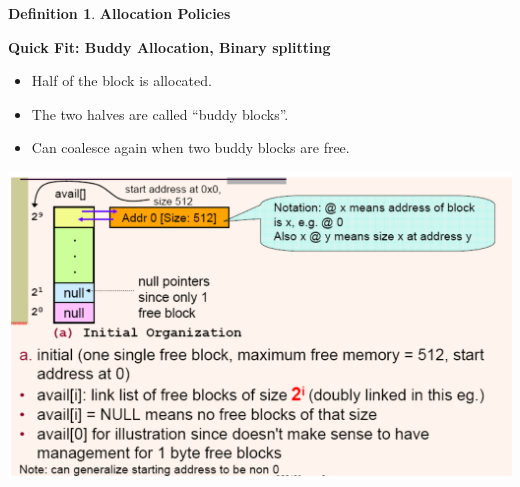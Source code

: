 \documentclass[11pt,a4paper]{article}
\theoremstyle{definition}
\newtheorem{definition}{Definition}[section]
\newenvironment{myitemize}
{ \begin{itemize}
    \setlength{\itemsep}{5pt}
    \setlength{\parskip}{0pt}
    \setlength{\parsep}{0pt}     }
{ \end{itemize}                  }
\begin{document}
\begin{definition}{\textbf{Allocation Policies}}
\begin{myitemize}
		\begin{minipage}{0.4\linewidth}
		\textbf{Quick Fit: Buddy Allocation, Binary splitting}
		\begin{myitemize}
			\item Half of the block is allocated.
			\item The two halves are called ``buddy blocks''.
			\item Can coalesce again when two buddy blocks are free.
		\end{myitemize}
		\end{minipage}\hspace{5mm}
		\begin{minipage}{0.55\linewidth}
			\includegraphics[width=\linewidth]{m4/buddyAllocation1}
		\end{minipage}

	\end{myitemize}
\end{definition}
\end{document}
